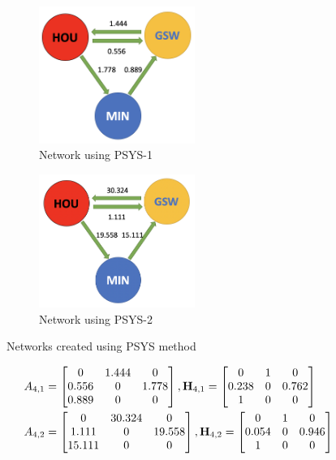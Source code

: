 \documentclass[12pt]{article}%
\begin{document}
\begin{enumerate}
  \begin{figure}[H]
  \centering
\begin{subfigure}{.5\textwidth}
  \centering
  \includegraphics[width=2in]{./images/PSYS-1.png}
  \caption{Network using PSYS-1}
  \label{fig:sub1}
\end{subfigure}%
\begin{subfigure}{.5\textwidth}
  \centering
  \includegraphics[width=2in]{./images/PSYS-2.png}
  \caption{Network using PSYS-2}
  \label{fig:sub2}
\end{subfigure}
\caption{Networks created using PSYS method}
\label{fig:test}
  \end{figure}
  \begin{align*}
&A_{4,1} =\begin{bmatrix}0 & 1.444 & 0\\0.556 & 0 & 1.778\\0.889 & 0 & 0\end{bmatrix}, \textbf H_{4,1}=\begin{bmatrix}0 & 1 & 0\\0.238 & 0 & 0.762\\1 & 0 & 0\end{bmatrix}\\
&A_{4,2} =\begin{bmatrix}0 & 30.324 & 0\\1.111 & 0 & 19.558\\15.111 & 0 & 0\end{bmatrix}, \textbf H_{4,2}=\begin{bmatrix}0 & 1 & 0\\0.054 & 0 & 0.946\\1 & 0 & 0\end{bmatrix}
\end{align*}

\end{enumerate}
\end{document}
